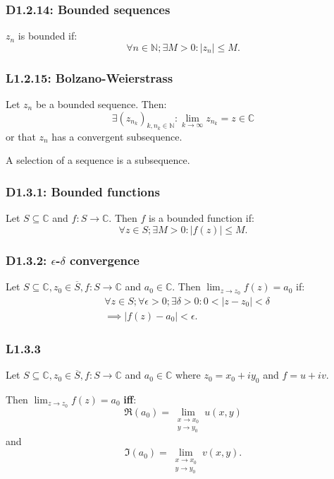\documentclass{article}
\begin{document}
\begin{multicols*}{3}
\subsubsection*{D1.2.14: Bounded sequences}
$z_n$ is bounded if:
$$\forall n\in\mathbb{N};\exists M>0:|z_n|\leq M.$$

\subsubsection*{L1.2.15: Bolzano-Weierstrass}
Let $z_n$ be a bounded sequence. Then:
$$\exists (z_{n_k})_{k,n_k\in\mathbb{N}}:
\lim_{k\rightarrow\infty}z_{n_k}=z\in\mathbb{C}$$
or that $z_n$ has a convergent subsequence.

A selection of a sequence is a subsequence.

\newcolumn

\subsubsection*{D1.3.1: Bounded functions}
Let $S\subseteq\mathbb{C}$ and $f:S\rightarrow\mathbb{C}$.
Then $f$ is a bounded function if:
$$\forall z\in S;\exists M>0:|f(z)|\leq M.$$

\subsubsection*{D1.3.2: $\epsilon$-$\delta$ convergence}
Let $S\subseteq\mathbb{C}, z_0\in\overline{S},f:S\rightarrow\mathbb{C}$
and $a_0\in\mathbb{C}$.
Then $\displaystyle\lim_{z\rightarrow z_0}f(z)=a_0$ if:
\begin{align*}
    &\forall z\in S;\forall\epsilon>0;\exists\delta>0:
    0<|z-z_0|<\delta \\
    &\implies|f(z)-a_0|<\epsilon.
\end{align*}

\subsubsection*{L1.3.3}
Let $S\subseteq\mathbb{C}, z_0\in\overline{S},
f:S\rightarrow\mathbb{C}$ and $a_0\in\mathbb{C}$ where $z_0=x_0+iy_0$
and $f=u+iv$.

Then $\displaystyle\lim_{z\rightarrow z_0}f(z)=a_0$ \textbf{if{}f}:
$$\Re(a_0)=\lim\limits_{\substack{
    x \to x_0 \\
    y \to y_0}}u(x,y)$$
and
$$\Im(a_0)=\lim\limits_{\substack{
    x \to x_0 \\
    y \to y_0}}v(x,y).$$


\end{multicols*}
\end{document}

